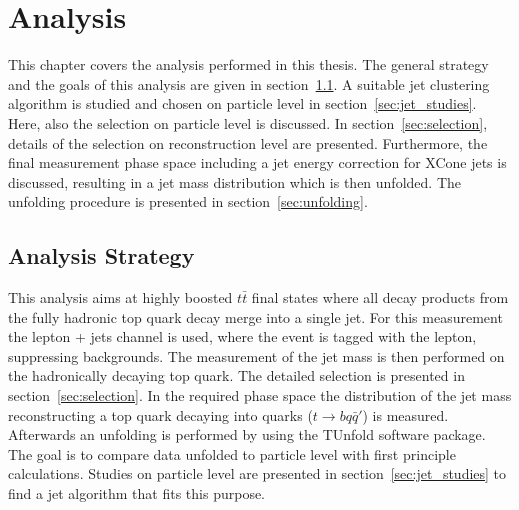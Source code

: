 \chapter{Analysis}
\label{ch:Ana}
	This chapter covers the analysis performed in this thesis. The general strategy and the goals of this analysis are given in section~\ref{sec:strategy}. A suitable jet clustering algorithm is studied and chosen on particle level in section~\ref{sec:jet_studies}. Here, also the selection on particle level is discussed. In section~\ref{sec:selection}, details of the selection on reconstruction level are presented. Furthermore, the final measurement phase space including a jet energy correction for XCone jets is discussed, resulting in a jet mass distribution which is then unfolded. The unfolding procedure is presented in section~\ref{sec:unfolding}.
	
\section{Analysis Strategy}
\label{sec:strategy}
	This analysis aims at highly boosted $t\bar{t}$ final states where all decay products from the fully hadronic top quark decay merge into a single jet. For this measurement the lepton + jets channel is used, where the event is tagged with the lepton, suppressing backgrounds. The measurement of the jet mass is then performed on the hadronically decaying top quark. The detailed selection is presented in section~\ref{sec:selection}. In the required phase space the distribution of the jet mass reconstructing a top quark decaying into quarks ($t\rightarrow b q \bar{q}'$) is measured. Afterwards an unfolding is performed by using the TUnfold \cite{tunfold} software package. The goal is to compare data unfolded to particle level with first principle calculations. Studies on particle level are presented in section~\ref{sec:jet_studies} to find a jet algorithm that fits this purpose.
	

